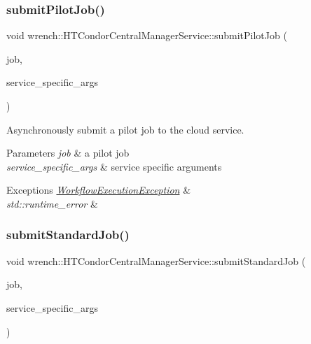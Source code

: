 \subsubsection{\texorpdfstring{submit\+Pilot\+Job()}{submitPilotJob()}}
{\footnotesize\ttfamily void wrench\+::\+H\+T\+Condor\+Central\+Manager\+Service\+::submit\+Pilot\+Job (\begin{DoxyParamCaption}\item[{\hyperlink{classwrench_1_1_pilot_job}{Pilot\+Job} $\ast$}]{job,  }\item[{std\+::map$<$ std\+::string, std\+::string $>$ \&}]{service\+\_\+specific\+\_\+args }\end{DoxyParamCaption})\hspace{0.3cm}{\ttfamily [override]}}



Asynchronously submit a pilot job to the cloud service. 


\begin{DoxyParams}{Parameters}
{\em job} & a pilot job \\
\hline
{\em service\+\_\+specific\+\_\+args} & service specific arguments\\
\hline
\end{DoxyParams}

\begin{DoxyExceptions}{Exceptions}
{\em \hyperlink{classwrench_1_1_workflow_execution_exception}{Workflow\+Execution\+Exception}} & \\
\hline
{\em std\+::runtime\+\_\+error} & \\
\hline
\end{DoxyExceptions}
\mbox{\label{classwrench_1_1_h_t_condor_central_manager_service_a13c687548742cb39b6529e63a9b7e6a4}} 
\subsubsection{\texorpdfstring{submit\+Standard\+Job()}{submitStandardJob()}}
{\footnotesize\ttfamily void wrench\+::\+H\+T\+Condor\+Central\+Manager\+Service\+::submit\+Standard\+Job (\begin{DoxyParamCaption}\item[{\hyperlink{classwrench_1_1_standard_job}{Standard\+Job} $\ast$}]{job,  }\item[{std\+::map$<$ std\+::string, std\+::string $>$ \&}]{service\+\_\+specific\+\_\+args }\end{DoxyParamCaption})\hspace{0.3cm}{\ttfamily [override]}}




